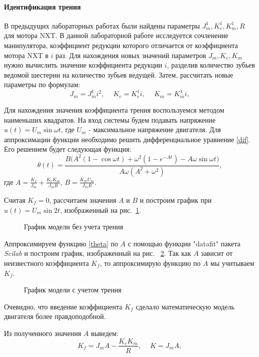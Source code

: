 \paragraph*{Идентификация трения\\}
\hspace*{\parindent}В предыдущих лабораторных работах были найдены параметры $J_m^1, K_e^1, K_m^1, R$ для мотора NXT. В данной лабораторной работе исследуется сочленение манипулятора, коэффициент редукции которого отличается от коэффициента мотора NXT в $i$ раз. Для нахождения новых значений параметров $J_m, K_e, K_m$ нужно вычислить значение коэффициента редукции $i$, разделив количество зубьев ведомой шестерни на количество зубьев ведущей. Затем, рассчитать новые параметры по формулам:
\begin{equation}
	J_m=J_m^1i^2, \phantom{-} K_e = K_e^1i, \phantom{-} K_m = K_m^1i,
\end{equation}

Для нахождения значения коэффициента трения воспользуемся методом наименьших квадратов. На вход системы будем подавать напряжение $u(t) = U_m\sin{{\omega}t}$, где $U_m$ - максимальное напряжение двигателя. Для аппроксимации функции необходимо решить дифференциальное уравнение \eqref{dif}. Его решением будет следующая функция:
\begin{equation}\label{theta}
	\theta(t)=\frac{B(A^2(1-\cos{{\omega}}t)+\omega^2(1-e^{-At})-A\omega\sin{{\omega}t)}}{A\omega(A^2+\omega^2)},
\end{equation}где $A=\frac{K_f}{J_m}+\frac{K_eK_m}{J_mR}$, $B=\frac{K_mU_m}{J_mR}$.

Считая $K_f = 0$, рассчитаем значения $A$ и $B$ и построим график при $u(t) = U_m\sin{2t}$, изображенный на рис.~\ref{nofr}.

\begin{figure}[h]
	\noindent{}
	\caption{График модели без учета трения}
	\label{nofr}
\end{figure}

Аппроксимируем функцию \eqref{theta} по $A$ с помощью функции "datafit" пакета \textit{Scilab} и построим график, изображенный на рис.~ \ref{yesfr}. Так как $A$ зависит от неизвестного коэффициента $K_f$, то аппроксимирую функцию по $A$ мы учитываем $K_f$. 

\begin{figure}[h]
	\noindent{}
	\caption{График модели с учетом трения}
	\label{yesfr}
\end{figure}

Очевидно, что введение коэффициента $K_f$ сделало математическую модель двигателя более правдоподобной.

Из полученного значения $A$ выведем:
\begin{equation}
	K_f = J_mA-\frac{K_eK_m}{R}, \phantom{-} K=J_mA,
\end{equation}


